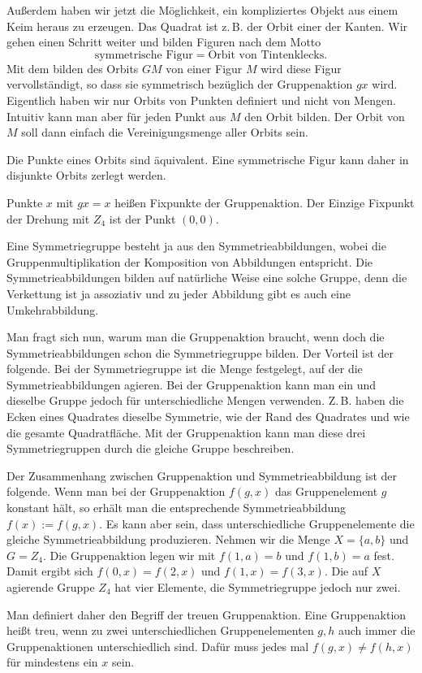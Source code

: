 \documentclass[a4paper,11pt,fleqn,twocolumn,twoside,dvipdfmx]{scrartcl}
\begin{document}
Außerdem haben wir jetzt die Möglichkeit, ein kompliziertes Objekt
aus einem Keim heraus zu erzeugen. Das Quadrat ist z.\,B. der Orbit
einer der Kanten. Wir gehen einen Schritt weiter und bilden Figuren
nach dem Motto%
\[\text{symmetrische Figur} = \text{Orbit von Tintenklecks}.\]
Mit dem bilden des Orbits $GM$ von einer Figur $M$ wird diese Figur
vervollständigt, so dass sie symmetrisch bezüglich der Gruppenaktion
$gx$ wird. Eigentlich haben wir nur Orbits von Punkten definiert und
nicht von Mengen. Intuitiv kann man aber für jeden Punkt aus $M$ den
Orbit bilden. Der Orbit von $M$ soll dann einfach die Vereinigungsmenge
aller Orbits sein.

Die Punkte eines Orbits sind äquivalent. Eine symmetrische Figur kann
daher in disjunkte Orbits zerlegt werden.

Punkte $x$ mit $gx=x$ heißen Fixpunkte der Gruppenaktion.
Der Einzige Fixpunkt der Drehung mit $Z_4$ ist der Punkt $(0,0)$.

Eine Symmetriegruppe besteht ja aus den Symmetrieabbildungen,
wobei die Gruppenmultiplikation der Komposition von Abbildungen
entspricht. Die Symmetrieabbildungen bilden auf natürliche Weise
eine solche Gruppe, denn die Verkettung ist ja assoziativ und zu
jeder Abbildung gibt es auch eine Umkehrabbildung.

Man fragt sich nun, warum man die Gruppenaktion braucht, wenn doch
die Symmetrieabbildungen schon die Symmetriegruppe bilden. Der Vorteil
ist der folgende. Bei der Symmetriegruppe ist die Menge festgelegt,
auf der die Symmetrieabbildungen agieren. Bei der Gruppenaktion kann
man ein und dieselbe Gruppe jedoch für unterschiedliche Mengen
verwenden. Z.\,B. haben die Ecken eines Quadrates dieselbe Symmetrie,
wie der Rand des Quadrates und wie die gesamte Quadratfläche. Mit der
Gruppenaktion kann man diese drei Symmetriegruppen durch die gleiche
Gruppe beschreiben.

Der Zusammenhang zwischen Gruppenaktion und Symmetrieabbildung ist der
folgende. Wenn man bei der Gruppenaktion $f(g,x)$ das Gruppenelement
$g$ konstant hält, so erhält man die entsprechende Symmetrieabbildung
$f(x):=f(g,x)$. Es kann aber sein, dass unterschiedliche
Gruppenelemente die gleiche Symmetrieabbildung produzieren. Nehmen wir
die Menge $X=\{a,b\}$ und $G=Z_4$. Die Gruppenaktion legen wir mit
$f(1,a)=b$ und $f(1,b)=a$ fest. Damit ergibt sich $f(0,x)=f(2,x)$
und $f(1,x)=f(3,x)$. Die auf $X$ agierende Gruppe $Z_4$ hat vier
Elemente, die Symmetriegruppe jedoch nur zwei.

Man definiert daher den Begriff der treuen Gruppenaktion.
Eine Gruppenaktion heißt treu, wenn zu zwei unterschiedlichen
Gruppenelementen $g,h$ auch immer die Gruppenaktionen unterschiedlich
sind. Dafür muss jedes mal $f(g,x)\ne f(h,x)$ für mindestens ein $x$
sein.
\end{document}

